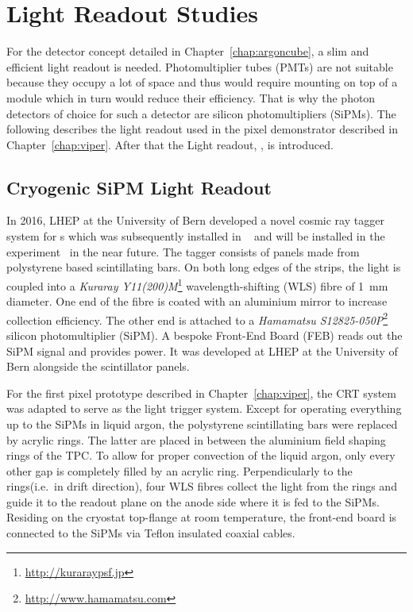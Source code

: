 \chapter{Light Readout Studies}
\label{chap:light-ro}

For the \AC{} detector concept detailed in Chapter~\ref{chap:argoncube}, a slim and efficient light readout is needed.
Photomultiplier tubes (PMTs) are not suitable because they occupy a lot of space and thus would require mounting on top of a module which in turn would reduce their efficiency.
That is why the photon detectors of choice for such a detector are silicon photomultipliers (SiPMs).
The following describes the light readout used in the \AC{} pixel demonstrator described in Chapter~\ref{chap:viper}.
After that the \AC{} Light readout, \AL{}, is introduced.


\section{Cryogenic SiPM Light Readout}
\label{sec:light-ro_viper}

In 2016, LHEP at the University of Bern developed a novel cosmic ray tagger system for \lartpc{}s which was subsequently installed in \uboone{}~\cite{uboone} and will be installed in the \sbnd{} experiment~\cite{sbnd} in the near future.
The tagger consists of panels made from polystyrene based scintillating bars.
On both long edges of the strips, the light is coupled into a \emph{Kuraray Y11(200)M}\footnote{\url{http://kuraraypsf.jp}} wavelength-shifting (WLS) fibre of \SI{1}{\milli\metre} diameter.
One end of the fibre is coated with an aluminium mirror to increase collection efficiency.
The other end is attached to a \emph{Hamamatsu S12825-050P}\footnote{\url{http://www.hamamatsu.com}} silicon photomultiplier (SiPM).
A bespoke Front-End Board (FEB) reads out the SiPM signal and provides power.
It was developed at LHEP at the University of Bern alongside the scintillator panels\cite{crt_feb}.

For the first pixel prototype described in Chapter~\ref{chap:viper}, the CRT system was adapted to serve as the light trigger system.
Except for operating everything up to the SiPMs in liquid argon, the polystyrene scintillating bars were replaced by acrylic rings.
The latter are placed in between the aluminium field shaping rings of the TPC.
To allow for proper convection of the liquid argon, only every other gap is completely filled by an acrylic ring.
Perpendicularly to the rings(i.e.\ in drift direction), four WLS fibres collect the light from the rings and guide it to the readout plane on the anode side where it is fed to the SiPMs.
Residing on the cryostat top-flange at room temperature, the front-end board is connected to the SiPMs via Teflon insulated coaxial cables.

